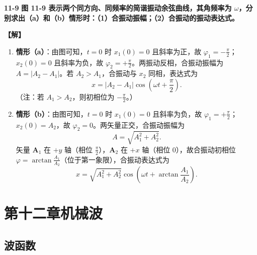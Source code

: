 \documentclass[zihao=5,a4paper,UTF8]{ctexart}
\newenvironment{prob}[2]{%
    \par\vspace{6pt}\noindent\textbf{\color{navy}#1} \textbf{#2}\par\nopagebreak\vspace{2pt}%
}{%
    \par\vspace{4pt}%
}
\newcommand{\sol}{\noindent\textbf{\color{tealaccent}【解】}\ }
\newcommand{\vect}[1]{\bm{#1}}
\begin{document}
\begin{prob}{11-9}{图 11-9 表示两个同方向、同频率的简谐振动余弦曲线，其角频率为 $\omega$，分别求出（a）和（b）情形时：（1）合振动振幅；（2）合振动的振动表达式。}
\sol
\begin{enumerate}[leftmargin=2em, itemsep=2pt]
    \item \textbf{情形（a）}：由图可知，$t=0$ 时 $x_1(0) = 0$ 且斜率为正，故 $\varphi_1 = -\frac{\pi}{2}$；$x_2(0) = 0$ 且斜率为负，故 $\varphi_2 = +\frac{\pi}{2}$。两振动反相，合振动振幅为 $A = |A_2 - A_1|$。若 $A_2 > A_1$，合振动与 $x_2$ 同相，表达式为
    \[
        x = |A_2 - A_1|\cos\left(\omega t + \frac{\pi}{2}\right).
    \]
    （注：若 $A_1 > A_2$，则初相位为 $-\frac{\pi}{2}$。）
    \item \textbf{情形（b）}：由图可知，$t=0$ 时 $x_1(0) = 0$ 且斜率为负，故 $\varphi_1 = +\frac{\pi}{2}$；$x_2(0) = A_2$，故 $\varphi_2 = 0$。两矢量正交，合振动振幅为
    \[
        A = \sqrt{A_1^2 + A_2^2}.
    \]
    矢量 $\vect{A}_1$ 在 $+y$ 轴（相位 $\frac{\pi}{2}$），$\vect{A}_2$ 在 $+x$ 轴（相位 $0$），故合振动初相位 $\varphi = \arctan\frac{A_1}{A_2}$（位于第一象限），合振动表达式为
    \[
        x = \sqrt{A_1^2 + A_2^2}\cos\left(\omega t + \arctan\frac{A_1}{A_2}\right).
    \]
\end{enumerate}
\end{prob}

\section{第十二章\quad 机械波}

\subsection{波函数}
\end{document}
